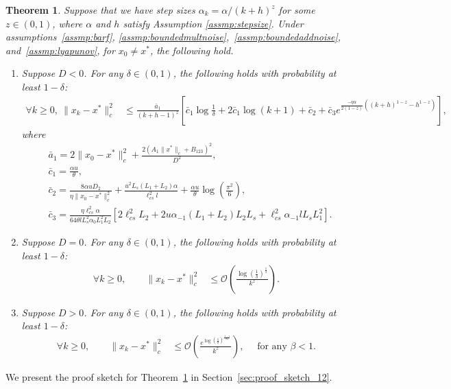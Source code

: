 \documentclass{article}
\newcommand{\lrp}[1]{\left( #1 \right)}
\newcommand{\lrs}[1]{\left[ #1 \right]}
\newcommand{\lcs}{\ell_{cs}}
\newtheorem{theorem}{Theorem}[section]
\begin{document}
\begin{theorem}\label{th:ballargumentboundz}
Suppose that we have step sizes $\alpha_k=\alpha/(k+h)^z$ for some $z\in(0,1)$, where $\alpha$ and $h$ satisfy Assumption \ref{assmp:stepsize}. Under assumptions~\ref{assmp:barf}, \ref{assmp:boundedmultnoise},~\ref{assmp:boundedaddnoise}, and~\ref{assmp:lyapunov}, for $x_0 \ne x^*$, the following hold.
\begin{enumerate}
    \item\label{ball_partz_cont} Suppose $D < 0$. For any $\delta \in (0,1)$, the following holds with probability at least $1-\delta$: 
    \begin{align*}
        \forall k\ge 0,~\|x_k - x^*\|^2_c &\le  \frac{\bar{a}_1}{(k+h-1)^z} \left[ \bar{c}_1\log\tfrac{1}{\delta} + 2\bar{c}_1\log\lrp{{k+1}} + \bar{c}_2 + \bar{c}_3 e^{\frac{-\eta \alpha}{2(1-z)}\lrp{(k+h)^{1-z} - h^{1-z}}} \right],
    \end{align*}
    where
    \begin{align*}
        &\bar{a}_1 = 2\|x_0 - x^*\|^2_c + \frac{2(A_1 \|x^*\|_c + B_{123})^2}{D^2}, \\
        &\bar{c}_1 = \frac{\alpha u}{\theta},\\
        &\bar{c}_2 = \frac{8 \alpha u D_2 }{\eta\|x_0 - x^*\|^2_c } + \frac{u^2 L_s (L_1 + L_2) \alpha}{\lcs^2 l} + \frac{\alpha u}{\theta}\log\left(\frac{\pi^2}{6}\right), \\
        &\bar{c}_3 = \frac{\eta\lcs^2 \alpha }{64 \theta l L^2_s \alpha_0 L^2_1 L_2 }\lrs{2\lcs^2 L_2 +  2 u \alpha_{-1} (L_1 + L_2)  L_2 L_s + \lcs^2 \alpha_{-1} l L_s L^2_1 }.
    \end{align*}
    \item \label{ball_partz_equal} Suppose $D = 0$. For any $\delta\in(0,1)$, the following holds with probability at least $1-\delta$: 
    \begin{align*}
     \forall k\ge 0, \qquad \|{x}_k - x^*\|^2_c &\leq \mathcal{O}\lrp{\frac{\log\left(\frac{1}{\delta}\right)^\frac{1}{z}}{k^z}}. 
    \end{align*}
    \item\label{ball_partz_exp} Suppose $D > 0$. For any $\delta\in(0,1)$, the following holds with probability at least $1-\delta$: 
    \begin{align*}
     \forall k\ge 0, \qquad \|{x}_k - x^*\|^2_c &\leq \mathcal{O}\lrp{\frac{e^{\log\left(\frac{1}{\delta}\right)^\frac{1-z}{ \beta z}}}{k^z}}, \quad \text{ for any }  \beta < 1. 
    \end{align*}
\end{enumerate}
\end{theorem}
We present the proof sketch for Theorem~\ref{th:ballargumentboundz} in Section~\ref{sec:proof_sketch_12}.\\ %
\end{document}
